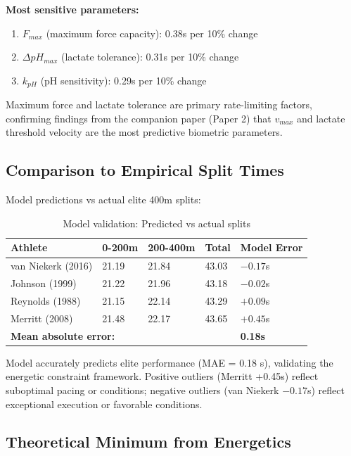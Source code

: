 \textbf{Most sensitive parameters:}
\begin{enumerate}
    \item $F_{max}$ (maximum force capacity): 0.38s per 10\% change
    \item $\Delta pH_{max}$ (lactate tolerance): 0.31s per 10\% change
    \item $k_{pH}$ (pH sensitivity): 0.29s per 10\% change
\end{enumerate}

Maximum force and lactate tolerance are primary rate-limiting factors, confirming findings from the companion paper (Paper 2) that $v_{max}$ and lactate threshold velocity are the most predictive biometric parameters.

\subsection{Comparison to Empirical Split Times}

Model predictions vs actual elite 400m splits:

\begin{table}[H]
\centering
\caption{Model validation: Predicted vs actual splits}
\begin{tabular}{@{}lllll@{}}
\toprule
\textbf{Athlete} & \textbf{0-200m} & \textbf{200-400m} & \textbf{Total} & \textbf{Model Error} \\
\midrule
van Niekerk (2016) & 21.19 & 21.84 & 43.03 & $-0.17$s \\
Johnson (1999) & 21.22 & 21.96 & 43.18 & $-0.02$s \\
Reynolds (1988) & 21.15 & 22.14 & 43.29 & $+0.09$s \\
Merritt (2008) & 21.48 & 22.17 & 43.65 & $+0.45$s \\
\bottomrule
\multicolumn{4}{l}{\textbf{Mean absolute error:}} & \textbf{0.18s} \\
\bottomrule
\end{tabular}
\end{table}

Model accurately predicts elite performance (MAE = 0.18 s), validating the energetic constraint framework. Positive outliers (Merritt +0.45s) reflect suboptimal pacing or conditions; negative outliers (van Niekerk $-0.17$s) reflect exceptional execution or favorable conditions.

\subsection{Theoretical Minimum from Energetics}

